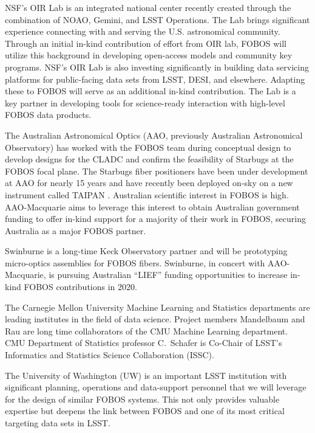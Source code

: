 \documentclass[oneside,11pt]{amsart}
\begin{document}
  NSF’s OIR Lab is an integrated national center recently created through the
combination of NOAO, Gemini, and LSST Operations. The Lab brings significant experience connecting with and serving the
U.S. astronomical community. Through an initial in-kind contribution of effort from OIR lab, FOBOS will utilize this
background in developing open-access models and community key programs. NSF’s OIR Lab is also investing significantly
in building data servicing platforms for public-facing data sets from LSST, DESI, and elsewhere.  Adapting these to
FOBOS will serve as an additional in-kind contribution. The Lab is a key partner in developing tools for science-ready
interaction with high-level FOBOS data products.

 The Australian Astronomical Optics (AAO, previously Australian
Astronomical Observatory) has worked with the FOBOS team during conceptual design to develop designs for the CLADC and
confirm the feasibility of Starbugs at the FOBOS focal plane.  The Starbugs fiber positioners have been under
development at AAO for nearly 15 years and have recently been deployed on-sky on a new instrument called TAIPAN
\cite{staszak16}.  Australian scientific interest in FOBOS is high.  AAO-Macquarie aims to leverage this interest to obtain Australian government funding to offer in-kind support for a majority of their work in FOBOS, securing Australia as a major FOBOS partner.


 Swinburne is a long-time Keck Observatory partner and will be prototyping micro-optics assemblies for FOBOS fibers.  Swinburne, in concert with AAO-Macquarie, is pursuing Australian ``LIEF'' funding opportunities to increase in-kind FOBOS contributions in 2020.


 The Carnegie Mellon University Machine Learning and Statistics
departments are leading institutes in the field of data science.  Project members Mandelbaum and Rau are long time
collaborators of the CMU Machine Learning department.  CMU Department of Statistics professor C.~Schafer is Co-Chair of
LSST's Informatics and Statistics Science Collaboration (ISSC).


 The University of Washington (UW) is an important LSST institution with significant planning, operations and data-support personnel that we will leverage for the design of similar FOBOS systems.  This not only provides valuable expertise but deepens the link between FOBOS and one of its most critical targeting data sets in LSST.
\end{document}
